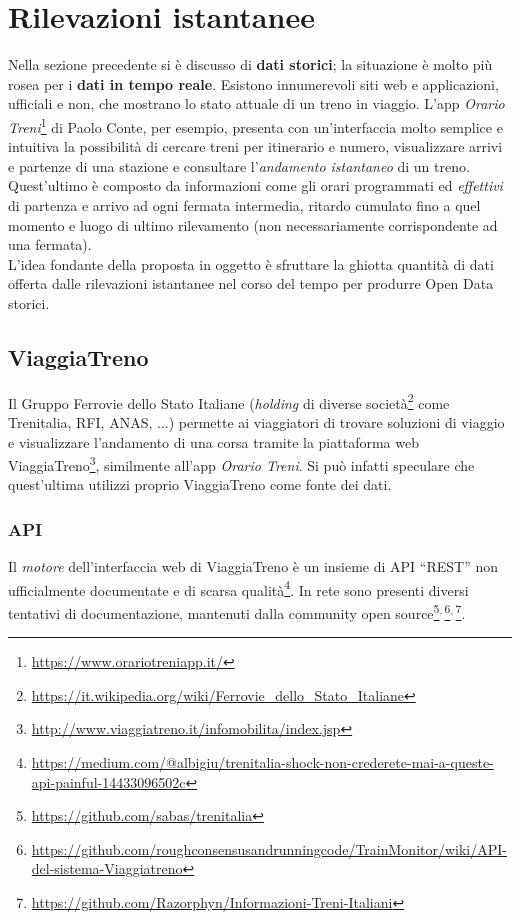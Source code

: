 \documentclass[italian,11pt,a4paper,final]{article}
\newcommand{\hochkomma}{$^{,\,}$}
\begin{document}
	\section{Rilevazioni istantanee}
	Nella sezione precedente si è discusso di \textbf{dati storici}; la situazione è molto più rosea per i \textbf{dati in tempo reale}.
	Esistono innumerevoli siti web e applicazioni, ufficiali e non, che mostrano lo stato attuale di un treno in viaggio.
	L'app \textit{Orario Treni}\footnote{\url{https://www.orariotreniapp.it/}} di Paolo Conte, per esempio, presenta con un'interfaccia molto semplice e intuitiva la possibilità di cercare treni per itinerario e numero, visualizzare arrivi e partenze di una stazione e consultare l'\textit{andamento istantaneo} di un treno.
	Quest'ultimo è composto da informazioni come gli orari programmati ed \textit{effettivi} di partenza e arrivo ad ogni fermata intermedia, ritardo cumulato fino a quel momento e luogo di ultimo rilevamento (non necessariamente corrispondente ad una fermata). \\

	L'idea fondante della proposta in oggetto è sfruttare la ghiotta quantità di dati offerta dalle rilevazioni istantanee nel corso del tempo per produrre Open Data storici.

	\subsection{ViaggiaTreno}
	Il Gruppo Ferrovie dello Stato Italiane (\textit{holding} di diverse società\footnote{\url{https://it.wikipedia.org/wiki/Ferrovie_dello_Stato_Italiane}} come Trenitalia, RFI, ANAS, ...) permette ai viaggiatori di trovare soluzioni di viaggio e visualizzare l'andamento di una corsa tramite la piattaforma web ViaggiaTreno\footnote{\url{http://www.viaggiatreno.it/infomobilita/index.jsp}}, similmente all'app \textit{Orario Treni}.
	Si può infatti speculare che quest'ultima utilizzi proprio ViaggiaTreno come fonte dei dati.

	\subsubsection{API}
	Il \textit{motore} dell'interfaccia web di ViaggiaTreno è un insieme di API ``REST'' non ufficialmente documentate e di scarsa qualità\footnote{\url{https://medium.com/@albigiu/trenitalia-shock-non-crederete-mai-a-queste-api-painful-14433096502c}}.
	In rete sono presenti diversi tentativi di documentazione, mantenuti dalla community open source\footnote{\url{https://github.com/sabas/trenitalia}}\hochkomma\footnote{\url{https://github.com/roughconsensusandrunningcode/TrainMonitor/wiki/API-del-sistema-Viaggiatreno}}\hochkomma\footnote{\url{https://github.com/Razorphyn/Informazioni-Treni-Italiani}}.
\end{document}
